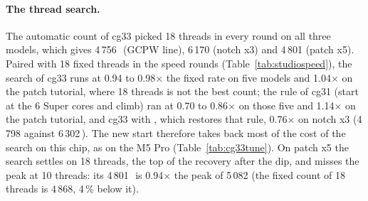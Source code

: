 \begin{table}[H]\centering\small
{}
\caption{M5 Max: cg33's CPU engine at 1 to 18 threads, in \MC, medians of 3 interleaved rounds (15\,000, 2\,000 and 1\,200
steps); the automatic count is in the text. The other processes used a median of 0.16 to 0.24 cores per model. Probes identical
to the reference's in every run. , section 3.}\label{tab:studiothreads}
\end{table}

\paragraph{The thread search.} The automatic count of cg33 picked 18 threads in every round on all three models, which
gives 4\,756\,\MC\ (GCPW line), 6\,170 (notch x3) and 4\,801 (patch x5). Paired with 18 fixed threads in the speed rounds
(Table~\ref{tab:studiospeed}), the search of cg33 runs at 0.94 to 0.98$\times$ the fixed rate on five models and 1.04$\times$
on the patch tutorial, where 18 threads is not the best count; the rule of cg31 (start at the 6 Super cores and climb) ran at
0.70 to 0.86$\times$ on those five and 1.14$\times$ on the patch tutorial, and cg33 with , which
restores that rule, 0.76$\times$ on notch x3 (4\,798 against 6\,302\,\MC). The new start therefore takes back most of the cost of the
search on this chip, as on the M5 Pro (Table~\ref{tab:cg33tune}). On patch x5 the search settles on 18 threads, the top of the
recovery after the dip, and misses the peak at 10 threads: its 4\,801\,\MC\ is 0.94$\times$ the peak of 5\,082 (the fixed count
of 18 threads is 4\,868, 4\,\% below it).

